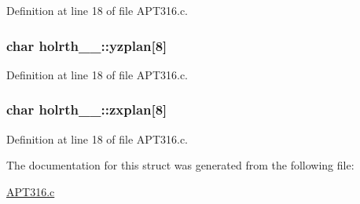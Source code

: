 Definition at line 18 of file A\+P\+T316.\+c.

\subsubsection[{\texorpdfstring{yzplan}{yzplan}}]{\setlength{\rightskip}{0pt plus 5cm}char holrth\+\_\+\_\+\+::yzplan\mbox{[}8\mbox{]}}\hypertarget{structholrth__1___ada529c4e51d5cb9af737179577610b15}{}\label{structholrth__1___ada529c4e51d5cb9af737179577610b15}


Definition at line 18 of file A\+P\+T316.\+c.

\subsubsection[{\texorpdfstring{zxplan}{zxplan}}]{\setlength{\rightskip}{0pt plus 5cm}char holrth\+\_\+\_\+\+::zxplan\mbox{[}8\mbox{]}}\hypertarget{structholrth__1___aa273c07356670f38ee715d3821a22849}{}\label{structholrth__1___aa273c07356670f38ee715d3821a22849}


Definition at line 18 of file A\+P\+T316.\+c.



The documentation for this struct was generated from the following file\+:\begin{DoxyCompactItemize}
\item 
\hyperlink{APT316_8c}{A\+P\+T316.\+c}\end{DoxyCompactItemize}
